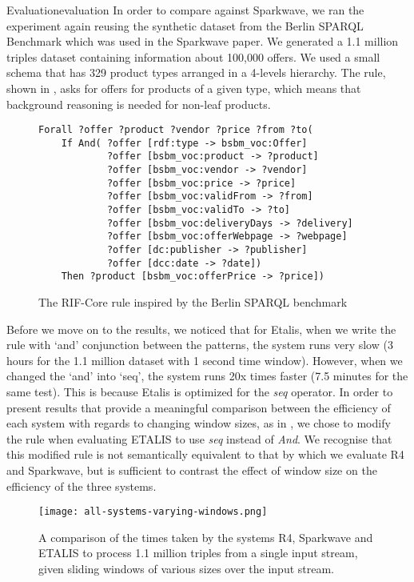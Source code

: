 \begin{nestedsection}{Evaluation}{evaluation}
	In order to compare against Sparkwave, we ran the experiment again reusing the synthetic dataset from the Berlin SPARQL Benchmark \citep{BSBMresults} which was used in the Sparkwave paper.
	We generated a 1.1 million triples dataset containing information about 100,000 offers.
	We used a small schema that has 329 product types arranged in a 4-levels hierarchy.
	The rule, shown in , asks for offers for products of a given type, which means that background reasoning is needed for non-leaf products.
	\begin{figure*}
		\centering
		\begin{verbatim}
Forall ?offer ?product ?vendor ?price ?from ?to(
    If And( ?offer [rdf:type -> bsbm_voc:Offer]
            ?offer [bsbm_voc:product -> ?product]
            ?offer [bsbm_voc:vendor -> ?vendor]
            ?offer [bsbm_voc:price -> ?price]
            ?offer [bsbm_voc:validFrom -> ?from]
            ?offer [bsbm_voc:validTo -> ?to]
            ?offer [bsbm_voc:deliveryDays -> ?delivery]
            ?offer [bsbm_voc:offerWebpage -> ?webpage]
            ?offer [dc:publisher -> ?publisher]
            ?offer [dcc:date -> ?date])
    Then ?product [bsbm_voc:offerPrice -> ?price])
		\end{verbatim}
		\caption{The RIF-Core rule inspired by the Berlin SPARQL benchmark}
	\end{figure*}
	Before we move on to the results, we noticed that for Etalis, when we write the rule with ‘and’ conjunction between the patterns, the system runs very slow (3 hours for the 1.1 million dataset with 1 second time window).
	However, when we changed the `and' into `seq', the system runs 20x times faster (7.5 minutes for the same test).
	This is because Etalis is optimized for the \emph{seq} operator.
	In order to present results that provide a meaningful comparison between the efficiency of each system with regards to changing window sizes, as in , we chose to modify the rule when evaluating ETALIS to use \emph{seq} instead of \emph{And}.
	We recognise that this modified rule is not semantically equivalent to that by which we evaluate R4 and Sparkwave, but is sufficient to contrast the effect of window size on the efficiency of the three systems.
	\begin{figure}
		\centering
		\texttt{[image: all-systems-varying-windows.png]}
		\caption{A comparison of the times taken by the systems R4, Sparkwave and ETALIS to process 1.1 million triples from a single input stream, given sliding windows of various sizes over the input stream.}

\end{figure}
\end{nestedsection}
